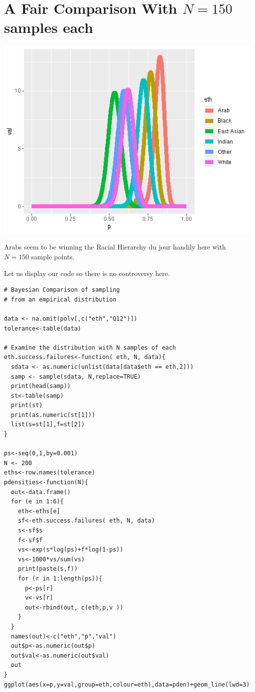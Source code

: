 \documentclass{amsart}
\begin{document}
\section{A Fair Comparison With $N=150$ samples each}

\includegraphics[scale=0.6]{tolerance_150.png}

Arabs seem to be winning the Racial Hierarchy du jour handily here with $N=150$ sample points.

Let us display our code so there is no controversy here.

\begin{verbatim}
# Bayesian Comparison of sampling
# from an empirical distribution

data <- na.omit(polv[,c("eth","Q12")])
tolerance<-table(data)

# Examine the distribution with N samples of each
eth.success.failures<-function( eth, N, data){
  sdata <- as.numeric(unlist(data[data$eth == eth,2]))
  samp <- sample(sdata, N,replace=TRUE)
  print(head(samp))
  st<-table(samp)
  print(st)
  print(as.numeric(st[1]))
  list(s=st[1],f=st[2])
}

ps<-seq(0,1,by=0.001)
N <- 200
eths<-row.names(tolerance)
pdensities<-function(N){
  out<-data.frame()
  for (e in 1:6){
    eth<-eths[e]
    sf<-eth.success.failures( eth, N, data)
    s<-sf$s
    f<-sf$f
    vs<-exp(s*log(ps)+f*log(1-ps))
    vs<-1000*vs/sum(vs)
    print(paste(s,f))
    for (r in 1:length(ps)){
      p<-ps[r]
      v<-vs[r]
      out<-rbind(out, c(eth,p,v ))
    }
  }
  names(out)<-c("eth","p","val")
  out$p<-as.numeric(out$p)
  out$val<-as.numeric(out$val)
  out
}
ggplot(aes(x=p,y=val,group=eth,colour=eth),data=pden)+geom_line(lwd=3)

\end{verbatim}
\end{document}
